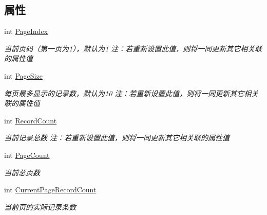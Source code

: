\subsection*{属性}
\begin{DoxyCompactItemize}
\item 
int \hyperlink{class_x_c_l_net_tools_1_1_entity_1_1_pager_info_a2cd0abb6744c59bbd9b98c758a023ac5}{Page\+Index}
\begin{DoxyCompactList}\small\item\em 当前页码（第一页为1），默认为1 注：若重新设置此值，则将一同更新其它相关联的属性值 \end{DoxyCompactList}\item 
int \hyperlink{class_x_c_l_net_tools_1_1_entity_1_1_pager_info_af9b5f737263571d79ead065f6faaa5ca}{Page\+Size}
\begin{DoxyCompactList}\small\item\em 每页最多显示的记录数，默认为10 注：若重新设置此值，则将一同更新其它相关联的属性值 \end{DoxyCompactList}\item 
int \hyperlink{class_x_c_l_net_tools_1_1_entity_1_1_pager_info_a5617d4aaafa80fa664f13cfe7fbc1a6c}{Record\+Count}
\begin{DoxyCompactList}\small\item\em 当前记录总数 注：若重新设置此值，则将一同更新其它相关联的属性值 \end{DoxyCompactList}\item 
int \hyperlink{class_x_c_l_net_tools_1_1_entity_1_1_pager_info_a986467ea00c659d4c81c036f2bfaa1b9}{Page\+Count}
\begin{DoxyCompactList}\small\item\em 当前总页数 \end{DoxyCompactList}\item 
int \hyperlink{class_x_c_l_net_tools_1_1_entity_1_1_pager_info_ac873f1babc543a806b6ec686bf9fc86a}{Current\+Page\+Record\+Count}
\begin{DoxyCompactList}\small\item\em 当前页的实际记录条数 \end{DoxyCompactList}\item 

\end{DoxyCompactItemize}
